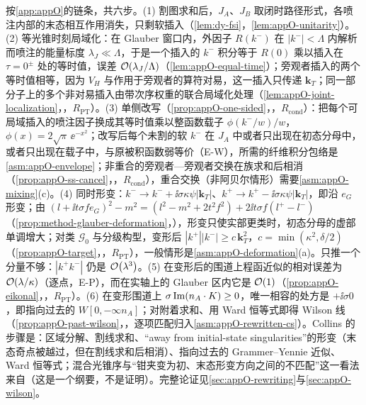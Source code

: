 \begin{proofsketch}
按\cref{app:appO}的链条，共六步。(1) 割图求和后，$J_A$、$J_B$ 取闭时路径形式，各喷注内部的末态相互作用消失，只剩软插入（\cref{lem:dy-fsi}，\cref{lem:appO-unitarity}）。(2) 等光锥时刻局域化：在 Glauber 窗口内，外因子 $R(k^-)$ 在 $|k^-|<\Lambda$ 内解析而喷注的能量标度 $\lambda_J\ll\Lambda$，于是一个插入的 $k^-$ 积分等于 $R(0)$ 乘以插入在 $\tau=0^\pm$ 处的等时值，误差 $\mathcal{O}\!\left(\lambda_J/\Lambda\right)$（\cref{lem:appO-equal-time}）；旁观者插入的两个等时值相等，因为 $V_H$ 与作用于旁观者的算符对易，这一插入只传递 $\mathbf k_T$；同一部分子上的多个非对易插入由带次序权重的联合局域化处理（\cref{lem:appO-joint-localization}，\tagR，$R_{\mathrm{PT}}$）。(3) 单侧改写（\cref{prop:appO-one-sided}，\tagR，$R_{\mathrm{cond}}$）：把每个可局域插入的喷注因子换成其等时值乘以整函数载子 $\phi(k^-/w)/w$，$\phi(x)=2\sqrt\pi\,\ee^{-x^2}$；改写后每个未割的软 $k^-$ 在 $J_A$ 中或者只出现在初态分母中，或者只出现在载子中，与原被积函数弱等价（E-W），所需的纤维积分包络是\cref{asm:appO-envelope}；非重合的旁观者—旁观者交换在族求和后相消（\cref{prop:appO-ss-cancel}，\tagR，$R_{\mathrm{cond}}$），重合交换（非阿贝尔情形）需要\cref{asm:appO-mixing}(c)。(4) 同时形变：$k^-\to k^-+\ii\sigma\kappa\psi|\mathbf k_T|$、$k^+\to k^+-\ii\sigma\kappa\psi|\mathbf k_T|$，即沿 $e_G$ 形变；由
$(l+\ii t\sigma fe_G)^2-m^2=(l^2-m^2+2t^2f^2)+2\ii t\sigma f(l^+-l^-)$（\cref{prop:method-glauber-deformation}，\tagA），形变只使实部更类时，初态分母的虚部单调增大；对类 $\mathcal G_0$ 与分级构型，变形后 $|k^+||k^-|\ge c\,\mathbf k_T^2$，$c=\min(\kappa^2,\delta/2)$（\cref{prop:appO-target}，\tagR，$R_{\mathrm{PT}}$），一般情形是\cref{asm:appO-deformation}(a)。只推一个分量不够：$|k^+k^-|$ 仍是 $\mathcal{O}\!\left(\lambda^3\right)$。(5) 在变形后的围道上程函近似的相对误差为 $\mathcal{O}\!\left(\lambda/\kappa\right)$（逐点，E-P），而在实轴上的 Glauber 区内它是 $\mathcal{O}\!\left(1\right)$（\cref{prop:appO-eikonal}，\tagR，$R_{\mathrm{PT}}$）。(6) 在变形围道上 $\sigma\operatorname{Im}(n_A\cdot K)\ge0$，唯一相容的处方是 $+\ii\sigma0$，即指向过去的 $W[0,-\infty n_A]$；对附着求和、用 Ward 恒等式即得 Wilson 线（\cref{prop:appO-past-wilson}，\tagA，逐项匹配归入\cref{asm:appO-rewritten-cs}）。Collins 的步骤是：区域分解、割线求和、“away from initial-state singularities”的形变（末态奇点被越过，但在割线求和后相消）、指向过去的 Grammer--Yennie 近似、Ward 恒等式\cite[第~14.4.1~节]{Collins2011}；混合光锥序与“钳夹变为初、末态形变方向之间的不匹配”这一看法来自\cite{AybatSterman2009}（这是一个纲要，不是证明）。完整论证见\cref{sec:appO-rewriting}与\cref{sec:appO-wilson}。
\end{proofsketch}

